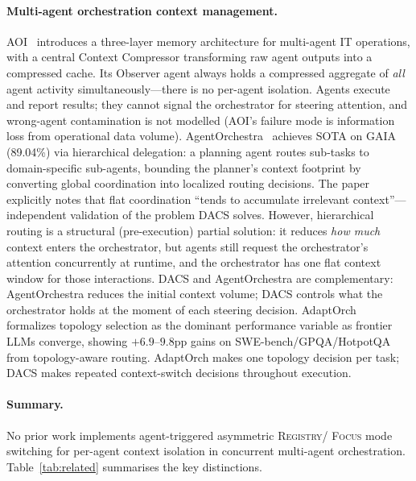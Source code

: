 \documentclass{article}
\begin{document}
\paragraph{Multi-agent orchestration context management.}
AOI~\citep{aoi2024} introduces a three-layer memory architecture for
multi-agent IT operations, with a central Context Compressor transforming
raw agent outputs into a compressed cache.
Its Observer agent always holds a compressed aggregate of \emph{all}
agent activity simultaneously—there is no per-agent isolation.
Agents execute and report results; they cannot signal the orchestrator
for steering attention, and wrong-agent contamination is not modelled
(AOI's failure mode is information loss from operational data volume).
AgentOrchestra~\citep{agentorchestra2025} achieves SOTA on GAIA (89.04\%)
via hierarchical delegation: a planning agent routes sub-tasks to
domain-specific sub-agents, bounding the planner's context footprint by
converting global coordination into localized routing decisions.
The paper explicitly notes that flat coordination ``tends to accumulate
irrelevant context''—independent validation of the problem DACS solves.
However, hierarchical routing is a structural (pre-execution) partial
solution: it reduces \emph{how much} context enters the orchestrator, but
agents still request the orchestrator's attention concurrently at runtime,
and the orchestrator has one flat context window for those interactions.
DACS and AgentOrchestra are complementary: AgentOrchestra reduces the
initial context volume; DACS controls what the orchestrator holds at the
moment of each steering decision.
AdaptOrch~\citep{adaptorch2025b} formalizes topology selection as the
dominant performance variable as frontier LLMs converge, showing
$+6.9$--$9.8$pp gains on SWE-bench/GPQA/HotpotQA from topology-aware
routing.
AdaptOrch makes one topology decision per task; DACS makes repeated
context-switch decisions throughout execution.

\paragraph{Summary.}
No prior work implements agent-triggered asymmetric \textsc{Registry}/
\textsc{Focus} mode switching for per-agent context isolation in
concurrent multi-agent orchestration.
Table~\ref{tab:related} summarises the key distinctions.
\end{document}
